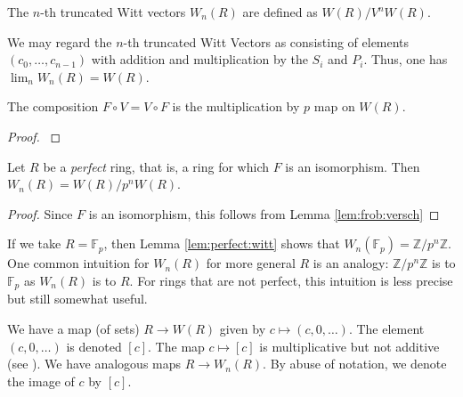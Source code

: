\begin{defn}
	The \(n\)-th truncated Witt vectors
	\(W_{n}(R)\) are defined as
	\(W(R) / V^{n}W(R)\).
\end{defn}

We may regard the \(n\)-th truncated Witt Vectors as consisting
of elements \((c_{0}, \ldots, c_{n-1})\) with addition
and multiplication by the \(S_{i}\) and \(P_{i}\).
Thus, one has \(\lim_{n} W_{n}(R) = W(R)\).

\begin{lem}
    \label{lem:frob:versch}
	The composition \(F \circ V = V \circ F\) is the multiplication by
	\(p\) map on \(W(R)\).
\end{lem}

\begin{proof}
	\cite[Proposition~5]{kim-2017-witt-vec}
\end{proof}

\begin{lem}
    \label{lem:perfect:witt}
    Let \(R\) be a \textit{perfect} ring,
    that is, a ring for which \(F\) is an isomorphism.
    Then \(W_{n}(R) = W(R) / p^{n}W(R)\).
\end{lem}

\begin{proof}
    Since \(F\) is an isomorphism, this follows from 
    Lemma \ref{lem:frob:versch}
\end{proof}

\begin{rmk}
    If we take \(R = \mathbb{F}_{p}\), then
    Lemma \ref{lem:perfect:witt}
    shows that \(W_{n}(\mathbb{F}_{p}) = \mathbb{Z} / p^{n}\mathbb{Z}\).
    One common intuition for \(W_{n}(R)\)
    for more general \(R\) is an analogy:
    \(\mathbb{Z} / p^{n}\mathbb{Z}\) 
    is to \(\mathbb{F}_{p}\) 
    as \(W_{n}(R)\) is to \(R\).
    For rings that are not perfect,
    this intuition is less precise but still
    somewhat useful.
\end{rmk}

\begin{nota}
    We have a map (of sets) 
    \(R \xrightarrow{} W(R)\) 
    given by 
    \(c \mapsto (c, 0, \ldots)\).
    The element \((c, 0, \ldots)\) is denoted
    \([c]\).
    The map \(c \mapsto [c]\) is multiplicative
    but not additive (see \cite[Section~1]{kim-2017-witt-vec}).
    We have analogous maps \(R \xrightarrow{} W_{n}(R)\).
    By abuse of notation, we denote 
    the image of \(c\) by \([c]\).
\end{nota}


